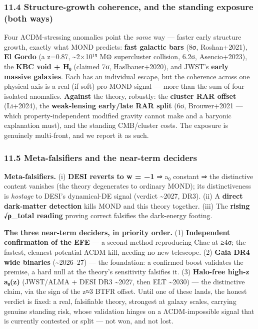 \documentclass[
]{article}
\begin{document}
\subsubsection{11.4 Structure-growth coherence, and the standing
exposure (both
ways)}\label{structure-growth-coherence-and-the-standing-exposure-both-ways}

Four ΛCDM-stressing anomalies point the \emph{same} way --- faster early
structure growth, exactly what MOND predicts: \textbf{fast galactic
bars} (8σ, Roshan+2021), \textbf{El Gordo} (a z=0.87,
\textasciitilde2×10¹⁵ M⊙ supercluster collision, 6.2σ, Asencio+2023),
the \textbf{KBC void + H₀} (claimed 7σ, Haslbauer+2020), and JWST's
\textbf{early massive galaxies}. Each has an individual escape, but the
coherence across one physical axis is a real (if soft) pro-MOND signal
--- more than the sum of four isolated anomalies. \textbf{Against} the
theory, robustly: the \textbf{cluster RAR offset} (Li+2024), the
\textbf{weak-lensing early/late RAR split} (6σ, Brouwer+2021 --- which
property-independent modified gravity cannot make and a baryonic
explanation must), and the standing CMB/cluster costs. The exposure is
genuinely multi-front, and we report it as such.

\subsubsection{11.5 Meta-falsifiers and the near-term
deciders}\label{meta-falsifiers-and-the-near-term-deciders}

\textbf{Meta-falsifiers.} (i) \textbf{DESI reverts to w = −1} ⇒ a₀
constant ⇒ the distinctive content vanishes (the theory degenerates to
ordinary MOND); its distinctiveness is \emph{hostage} to DESI's
dynamical-DE signal (verdict \textasciitilde2027, DR3). (ii) A
\textbf{direct dark-matter detection} kills MOND and this theory
together. (iii) The \textbf{rising √ρ\_total reading} proving correct
falsifies the dark-energy footing.

\textbf{The three near-term deciders, in priority order.} (1)
\textbf{Independent confirmation of the EFE} --- a second method
reproducing Chae at ≥4σ; the fastest, cleanest potential ΛCDM kill,
needing no new telescope. (2) \textbf{Gaia DR4 wide binaries}
(\textasciitilde2026--27) --- the foundation: a confirmed boost
validates the premise, a hard null at the theory's sensitivity falsifies
it. (3) \textbf{Halo-free high-z a₀(z)} (JWST/ALMA + DESI DR3
\textasciitilde2027, then ELT \textasciitilde2030) --- the distinctive
claim, via the sign of the z≈3 BTFR offset. Until one of these lands,
the honest verdict is fixed: a real, falsifiable theory, strongest at
galaxy scales, carrying genuine standing risk, whose validation hinges
on a ΛCDM-impossible signal that is currently contested or split --- not
won, and not lost.
\end{document}

